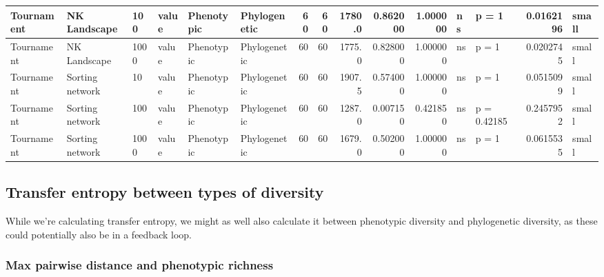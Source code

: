 \documentclass[]{book}
\begin{document}
\begin{table}
\begin{tabular}[t]{l|l|l|l|l|l|r|r|r|r|r|l|l|r|l}
\hline
Tournament & NK Landscape & 100 & value & Phenotypic & Phylogenetic & 60 & 60 & 1780.0 & 0.862000 & 1.000000 & ns & p = 1 & 0.0162196 & small\\
\hline
Tournament & NK Landscape & 1000 & value & Phenotypic & Phylogenetic & 60 & 60 & 1775.0 & 0.828000 & 1.000000 & ns & p = 1 & 0.0202745 & small\\
\hline
Tournament & Sorting network & 10 & value & Phenotypic & Phylogenetic & 60 & 60 & 1907.5 & 0.574000 & 1.000000 & ns & p = 1 & 0.0515099 & small\\
\hline
Tournament & Sorting network & 100 & value & Phenotypic & Phylogenetic & 60 & 60 & 1287.0 & 0.007150 & 0.421850 & ns & p = 0.42185 & 0.2457952 & small\\
\hline
Tournament & Sorting network & 1000 & value & Phenotypic & Phylogenetic & 60 & 60 & 1679.0 & 0.502000 & 1.000000 & ns & p = 1 & 0.0615535 & small\\
\hline
\end{tabular}
\end{table}

\hypertarget{transfer-entropy-between-types-of-diversity-1}{%
\subsection{Transfer entropy between types of diversity}\label{transfer-entropy-between-types-of-diversity-1}}

While we're calculating transfer entropy, we might as well also calculate it between phenotypic diversity and phylogenetic diversity, as these could potentially also be in a feedback loop.

\hypertarget{max-pairwise-distance-and-phenotypic-richness-1}{%
\subsubsection{Max pairwise distance and phenotypic richness}\label{max-pairwise-distance-and-phenotypic-richness-1}}
\end{document}
